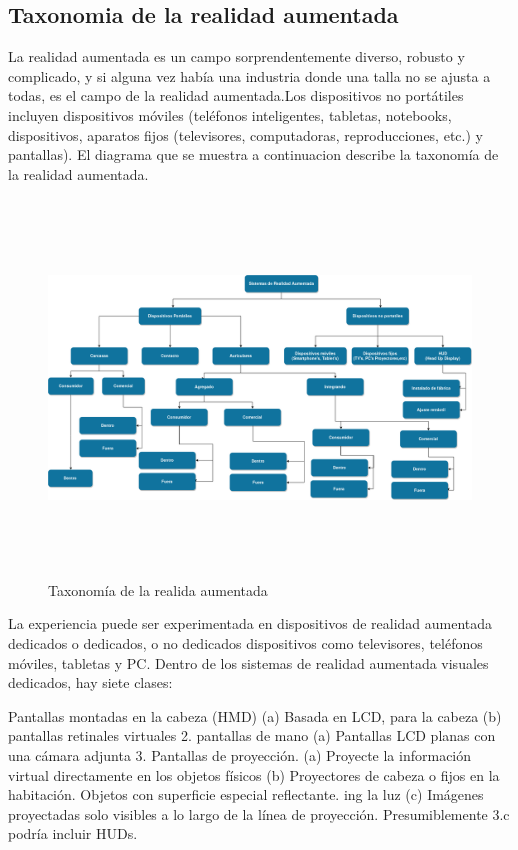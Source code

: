 \subsection{Taxonomia de la realidad aumentada}
La realidad aumentada es un campo sorprendentemente diverso, robusto y complicado, y si alguna vez había una industria donde una talla no se ajusta a todas, es el campo de la realidad aumentada.Los dispositivos no portátiles incluyen dispositivos móviles (teléfonos inteligentes, tabletas, notebooks, dispositivos, aparatos fijos (televisores, computadoras, reproducciones, etc.) y pantallas). El diagrama que se muestra a continuacion describe la taxonomía de la realidad aumentada.\cite{BXX} \par
\vspace{5mm}
\begin{figure}[h!]
	\centering
	\includegraphics[width=17cm,height=10cm]{imagenes/marcoteorico/ar/taxonomiaAR.png}
	\caption{Taxonomía de la realida aumentada\cite{BXX}}
	\label{fig:analogo}
\end{figure}
La experiencia puede ser experimentada en dispositivos de realidad aumentada dedicados o dedicados, o no dedicados dispositivos como televisores, teléfonos móviles, tabletas y PC. Dentro de los sistemas de realidad aumentada visuales dedicados, hay siete clases:\cite{BXX} \par
\vspace{5mm}
Pantallas montadas en la cabeza (HMD) (a) Basada en LCD, para la cabeza (b) pantallas retinales virtuales 2. pantallas de mano (a) Pantallas LCD planas con una cámara adjunta 3. Pantallas de proyección. (a) Proyecte la información virtual directamente en los objetos físicos (b) Proyectores de cabeza o fijos en la habitación. Objetos con superficie especial reflectante. ing la luz (c) Imágenes proyectadas solo visibles a lo largo de la línea de proyección. Presumiblemente 3.c podría incluir HUDs. \cite{BXX} \par
\vspace{5mm}

